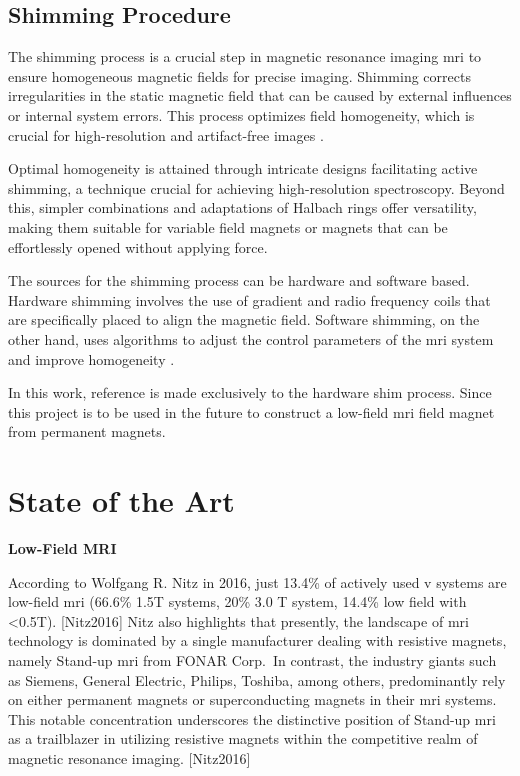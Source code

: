 \hypertarget{shimming-procedure}{%
\subsection{Shimming Procedure}\label{shimming-procedure}}

The shimming process is a crucial step in magnetic resonance imaging
\gls{mri} to ensure homogeneous magnetic fields for precise imaging.
Shimming corrects irregularities in the static magnetic field that can
be caused by external influences or internal system errors. This process
optimizes field homogeneity, which is crucial for high-resolution and
artifact-free images \cite{10.3389/fphy.2021.704566}.

Optimal homogeneity is attained through intricate designs facilitating
active shimming, a technique crucial for achieving high-resolution
spectroscopy. Beyond this, simpler combinations and adaptations of
Halbach rings offer versatility, making them suitable for variable field
magnets or magnets that can be effortlessly opened without applying
force. \cite{inbook}

The sources for the shimming process can be hardware and software based.
Hardware shimming involves the use of gradient and radio frequency coils
that are specifically placed to align the magnetic field. Software
shimming, on the other hand, uses algorithms to adjust the control
parameters of the \gls{mri} system and improve homogeneity
\cite{10.3389/fphy.2021.704566}.

In this work, reference is made exclusively to the hardware shim
process. Since this project is to be used in the future to construct a
low-field \gls{mri} field magnet from permanent magnets.

\hypertarget{state-of-the-art}{%
\section{State of the Art}\label{state-of-the-art}}

\textbf{Low-Field MRI}

According to Wolfgang R. Nitz in 2016, just 13.4\% of actively used v
systems are low-field \gls{mri} (66.6\% 1.5T systems, 20\% 3.0 T system,
14.4\% low field with \textless0.5T). {[}Nitz2016{]} Nitz also
highlights that presently, the landscape of \gls{mri} technology is
dominated by a single manufacturer dealing with resistive magnets,
namely Stand-up \gls{mri} from FONAR Corp.~In contrast, the industry
giants such as Siemens, General Electric, Philips, Toshiba, among
others, predominantly rely on either permanent magnets or
superconducting magnets in their \gls{mri} systems. This notable
concentration underscores the distinctive position of Stand-up \gls{mri}
as a trailblazer in utilizing resistive magnets within the competitive
realm of magnetic resonance imaging. {[}Nitz2016{]}

